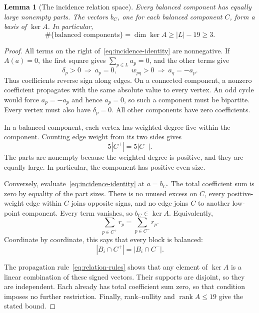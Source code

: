 \documentclass[11pt,letterpaper]{article}
\newtheorem{lemma}[theorem]{Lemma}
\theoremstyle{definition}\newtheorem{definition}[theorem]{Definition}
\theoremstyle{remark}\newtheorem{remark}[theorem]{Remark}
\begin{document}
\begin{lemma}[The incidence relation space]\label{lem:relation-space}
Every balanced component has equally large nonempty parts. The vectors $b_C$, one for each balanced component $C$, form a basis of $\ker A$. In particular,
\[
 \#\{\text{balanced components}\}=\dim\ker A\ge |L|-19\ge3.
\]
\end{lemma}
\begin{proof}
All terms on the right of~\eqref{eq:incidence-identity} are nonnegative. If $A(a)=0$, the first square gives $\sum_{p\in L}a_p=0$, and the other terms give
\begin{equation}\label{eq:relation-rules}
 \delta_p>0\ \Longrightarrow\ a_p=0,
 \qquad w_{pq}>0\ \Longrightarrow\ a_q=-a_p.
\end{equation}
Thus coefficients reverse sign along edges. On a connected component, a nonzero coefficient propagates with the same absolute value to every vertex. An odd cycle would force $a_p=-a_p$ and hence $a_p=0$, so such a component must be bipartite. Every vertex must also have $\delta_p=0$. All other components have zero coefficients.

In a balanced component, each vertex has weighted degree five within the component. Counting edge weight from its two sides gives
\[
 5|C^+|=5|C^-|.
\]
The parts are nonempty because the weighted degree is positive, and they are equally large. In particular, the component has positive even size.

Conversely, evaluate~\eqref{eq:incidence-identity} at $a=b_C$. The total coefficient sum is zero by equality of the part sizes. There is no unused excess on $C$, every positive-weight edge within $C$ joins opposite signs, and no edge joins $C$ to another low-point component. Every term vanishes, so $b_C\in\ker A$. Equivalently,
\begin{equation}\label{eq:vector-balance}
 \sum_{p\in C^+}r_p=\sum_{p\in C^-}r_p.
\end{equation}
Coordinate by coordinate, this says that every block is balanced:
\begin{equation}\label{eq:component-balance}
 |B_i\cap C^+|=|B_i\cap C^-|.
\end{equation}

The propagation rule~\eqref{eq:relation-rules} shows that any element of $\ker A$ is a linear combination of these signed vectors. Their supports are disjoint, so they are independent. Each already has total coefficient sum zero, so that condition imposes no further restriction. Finally, rank--nullity and $\operatorname{rank}A\le19$ give the stated bound.
\end{proof}
\end{document}
